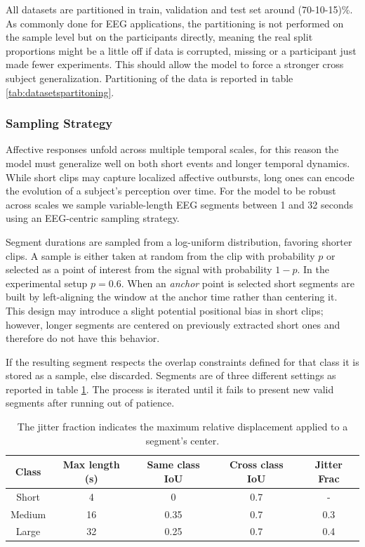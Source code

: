 All datasets are partitioned in train, validation and test set around (70-10-15)\%.
As commonly done for EEG applications, the partitioning is not performed on the sample level but on the participants directly,
meaning the real split proportions might be a little off if data is corrupted, missing or a participant just made fewer experiments.
This should allow the model to force a stronger cross subject generalization.
Partitioning of the data is reported in table \ref{tab:datasetspartitoning}.

\subsubsection{Sampling Strategy}
Affective responses unfold across multiple temporal scales, for this reason the model must generalize well on both short events and longer temporal dynamics.
While short clips may capture localized affective outbursts, long ones can encode the evolution of a subject's perception over time.
For the model to be robust across scales we sample variable-length EEG segments between 1 and 32 seconds using an EEG-centric sampling strategy.

Segment durations are sampled from a log-uniform distribution, favoring shorter clips.
A sample is either taken at random from the clip with probability $p$ or selected as a point of interest from the signal with probability $1-p$.
In the experimental setup $p=0.6$.
When an \textit{anchor} point is selected short segments are built by left-aligning the window at the anchor time rather than centering it.
This design may introduce a slight potential positional bias in short clips; however, longer segments are centered on previously extracted short ones and therefore do not have this behavior.

If the resulting segment respects the overlap constraints defined for that class it is stored as a sample, else discarded.
Segments are of three different settings as reported in table \ref{tab:sample}.
The process is iterated until it fails to present new valid segments after running out of patience.

\begin{table}
    \centering
    \begin{tabular}{c|c|c|c|c}

        Class  & Max length (s) & Same class IoU & Cross class IoU & Jitter Frac \\ \hline
        Short  & 4              & 0              & 0.7             & -           \\
        Medium & 16             & 0.35           & 0.7             & 0.3         \\
        Large  & 32             & 0.25           & 0.7             & 0.4         \\
    \end{tabular}
    \caption{The jitter fraction indicates the maximum relative displacement applied to a segment's center. }
    \label{tab:sample}
\end{table}

